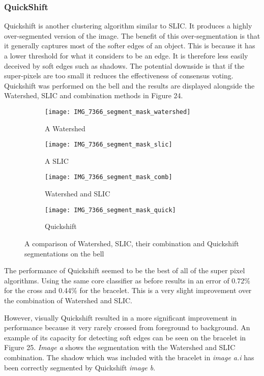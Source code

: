 \documentclass[12pt]{IIBproject}
\begin{document}
\subsubsection{QuickShift}
Quickshift is another clustering algorithm similar to SLIC. It produces a highly over-segmented version of the image. The benefit of this over-segmentation is that it generally captures most of the softer edges of an object. This is because it has a lower threshold for what it considers to be an edge. It is therefore less easily deceived by soft edges such as shadows. The potential downside is that if the super-pixels are too small it reduces the effectiveness of consensus voting. Quickshift was performed on the bell and the results are displayed alongside the Watershed, SLIC and combination methods in Figure 24.
\begin{figure}[H]
\centering
\begin{subfigure}{.45\textwidth}
  \centering
  \texttt{[image: IMG\_7366\_segment\_mask\_watershed]}
  \caption{A Watershed}
  \label{fig:sub1}
\end{subfigure}%
\begin{subfigure}{.45\textwidth}
  \centering
  \texttt{[image: IMG\_7366\_segment\_mask\_slic]}
  \caption{A SLIC}
  \label{fig:sub2}
\end{subfigure}
\begin{subfigure}{.45\textwidth}
  \centering
  \texttt{[image: IMG\_7366\_segment\_mask\_comb]}
  \caption{Watershed and SLIC}
  \label{fig:sub2}
\end{subfigure}
\begin{subfigure}{.45\textwidth}
  \centering
  \texttt{[image: IMG\_7366\_segment\_mask\_quick]}
  \caption{Quickshift }
  \label{fig:sub2}
\end{subfigure}
\caption{A comparison of Watershed, SLIC, their combination and Quickshift segmentations on the bell}
\label{fig:test}
\end{figure}



The performance of Quickshift seemed to be the best of all of the super pixel algorithms. Using the same core classifier as before results in an error of 0.72\% for the cross and 0.44\% for the bracelet. This is a very slight improvement over the combination of Watershed and SLIC. 

However, visually Quickshift resulted in a more significant improvement in performance because it very rarely crossed from foreground to background. An example of its capacity for detecting soft edges can be seen on the bracelet in Figure 25. \emph{Image a} shows the segmentation with the Watershed and SLIC combination. The shadow which was included with the bracelet in \emph{image a.i} has been correctly segmented by Quickshift \emph{image b}. 
\end{document}
